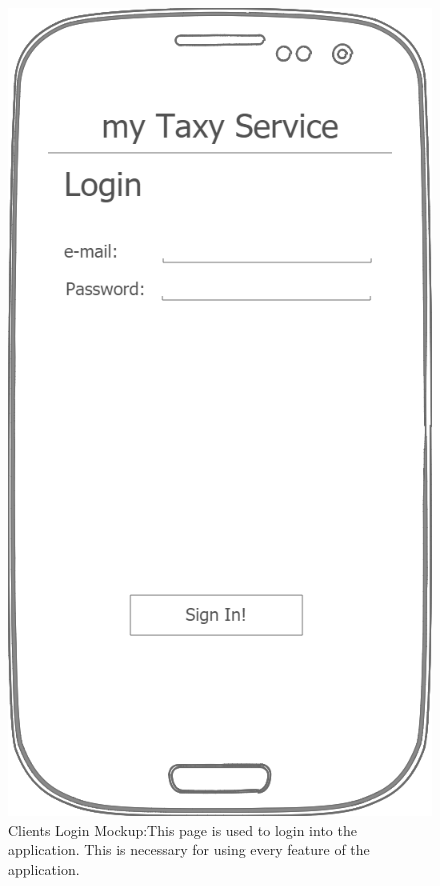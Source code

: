 \documentclass[a4paper]{article}
\begin{document}
\begin{figure}[H]
\includegraphics[width=\mockupWidth]{Mockup-ClientsLogin}
\centering
\caption[Clients Login Mockup]{Clients Login Mockup:\newline This page is used to login into the application. This is necessary for using every feature of the application.}
\label{fig:mockupclientlogin}
\end{figure}
\end{document}
